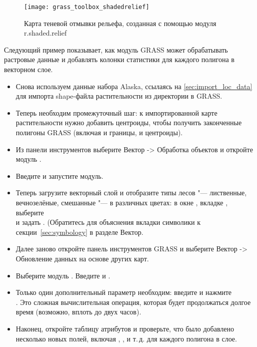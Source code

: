 \begin{figure}[ht]
 \centering
 \texttt{[image: grass\_toolbox\_shadedrelief]}
 \caption{Карта теневой отмывки рельефа, созданная с помощью модуля
   r.shaded.relief \nixcaption}\label{fig:grass_toolbox_shadedrelief}
\end{figure}


Следующий пример показывает, как модуль GRASS может обрабатывать
растровые данные и добавлять колонки статистики для каждого полигона в
векторном слое.

\begin{itemize}[label=--]
\item Снова используем данные набора Alaska, ссылаясь на
\ref{sec:import_loc_data} для импорта shape-файла растительности из
директории  в GRASS.
\item Теперь необходим промежуточный шаг: к импортированной карте
растительности нужно добавить центроиды, чтобы получить законченные
полигоны GRASS (включая и границы, и центроиды).
\item Из панели инструментов выберите Вектор -> Обработка объектов и
откройте модуль .
\item Введите 
и запустите модуль.
\item Теперь загрузите векторный слой  и
отобразите типы лесов "--- лиственные, вечнозелёные, смешанные "--- в
различных цветах: в окне , вкладке
, выберите \\
 и задать
. (Обратитесь для
объяснения вкладки символики к секции~\ref{sec:symbology} в разделе
Вектор.
\item Далее заново откройте панель инструментов GRASS и выберите
Вектор -> Обновление данных на основе других карт.
\item Выберите модуль . Введите
 и .
\item Только один дополнительный параметр необходим: введите
 и нажмите \\
. Это сложная вычислительная операция, которая будет
продолжаться долгое время (возможно, вплоть до двух часов).
\item Наконец, откройте таблицу атрибутов  и
проверьте, что было добавлено несколько новых полей, включая
, ,  и
т.\,д. для каждого полигона в слое.
\end{itemize}


